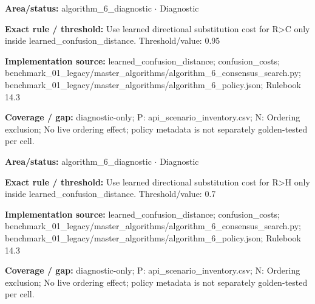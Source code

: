 \begin{tcolorbox}[enhanced,breakable,colback=white,colframe=Muted!45,boxrule=0.45pt,arc=1.5pt,left=6pt,right=6pt,top=5pt,bottom=5pt,title={\texttt{A6-LEARNED-SUBSTITUTION-R-C}},title after break={\texttt{A6-LEARNED-SUBSTITUTION-R-C}\ (continued)},fonttitle=\headingfont\bfseries\color{Navy},coltitle=Navy]
\textbf{Area/status:} algorithm\_\allowbreak{}6\_\allowbreak{}diagnostic $\boldsymbol{\cdot}$ Diagnostic\par
\smallskip
\textbf{Exact rule / threshold:} Use learned directional substitution cost for R>C only inside learned\_\allowbreak{}confusion\_\allowbreak{}distance. Threshold/\allowbreak{}value: 0.95\par
\smallskip
\textbf{Implementation source:} learned\_\allowbreak{}confusion\_\allowbreak{}distance; confusion\_\allowbreak{}costs; benchmark\_\allowbreak{}01\_\allowbreak{}legacy/\allowbreak{}master\_\allowbreak{}algorithms/\allowbreak{}algorithm\_\allowbreak{}6\_\allowbreak{}consensus\_\allowbreak{}search.py; benchmark\_\allowbreak{}01\_\allowbreak{}legacy/\allowbreak{}master\_\allowbreak{}algorithms/\allowbreak{}algorithm\_\allowbreak{}6\_\allowbreak{}policy.json; Rulebook 14.3\par
\smallskip
\textbf{Coverage / gap:} diagnostic-only; P: api\_\allowbreak{}scenario\_\allowbreak{}inventory.csv; N: Ordering exclusion; No live ordering effect; policy metadata is not separately golden-tested per cell.
\end{tcolorbox}
\begin{tcolorbox}[enhanced,breakable,colback=white,colframe=Muted!45,boxrule=0.45pt,arc=1.5pt,left=6pt,right=6pt,top=5pt,bottom=5pt,title={\texttt{A6-LEARNED-SUBSTITUTION-R-H}},title after break={\texttt{A6-LEARNED-SUBSTITUTION-R-H}\ (continued)},fonttitle=\headingfont\bfseries\color{Navy},coltitle=Navy]
\textbf{Area/status:} algorithm\_\allowbreak{}6\_\allowbreak{}diagnostic $\boldsymbol{\cdot}$ Diagnostic\par
\smallskip
\textbf{Exact rule / threshold:} Use learned directional substitution cost for R>H only inside learned\_\allowbreak{}confusion\_\allowbreak{}distance. Threshold/\allowbreak{}value: 0.7\par
\smallskip
\textbf{Implementation source:} learned\_\allowbreak{}confusion\_\allowbreak{}distance; confusion\_\allowbreak{}costs; benchmark\_\allowbreak{}01\_\allowbreak{}legacy/\allowbreak{}master\_\allowbreak{}algorithms/\allowbreak{}algorithm\_\allowbreak{}6\_\allowbreak{}consensus\_\allowbreak{}search.py; benchmark\_\allowbreak{}01\_\allowbreak{}legacy/\allowbreak{}master\_\allowbreak{}algorithms/\allowbreak{}algorithm\_\allowbreak{}6\_\allowbreak{}policy.json; Rulebook 14.3\par
\smallskip
\textbf{Coverage / gap:} diagnostic-only; P: api\_\allowbreak{}scenario\_\allowbreak{}inventory.csv; N: Ordering exclusion; No live ordering effect; policy metadata is not separately golden-tested per cell.
\end{tcolorbox}

